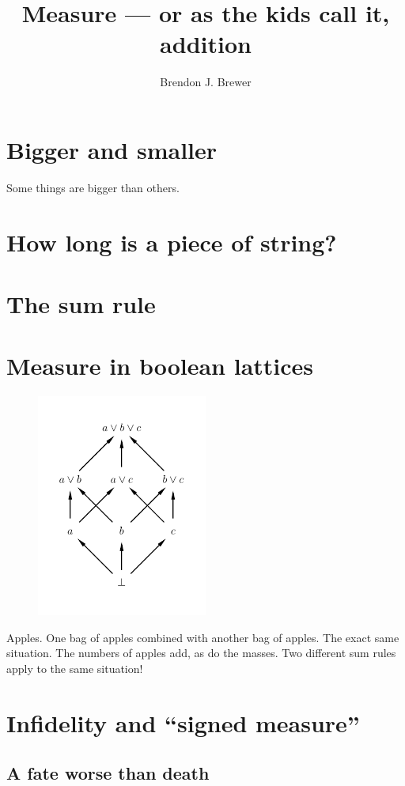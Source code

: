 \documentclass[a4paper, 12pt]{article}
\title{Measure --- or as the kids call it, addition}
\author{Brendon J. Brewer}
\date{}
\begin{document}
\maketitle

\setlength{\parindent}{0pt}
\setlength{\parskip}{8pt}

\section{Bigger and smaller}
Some things are bigger than others.

\section{How long is a piece of string?}

\section{The sum rule}

\section{Measure in boolean lattices}


\begin{figure}[!ht]
\centering
\includegraphics[width=0.5\textwidth]{figures/boolean_lattice.pdf}
\caption{\label{fig:boolean_lattice}}
\end{figure}


Apples.
One bag of apples combined with another bag of apples.
The exact same situation. The numbers of apples add, as
do the masses. Two different sum rules apply to the same
situation!


\section{Infidelity and ``signed measure''}

\subsection{A fate worse than death}
\end{document}
